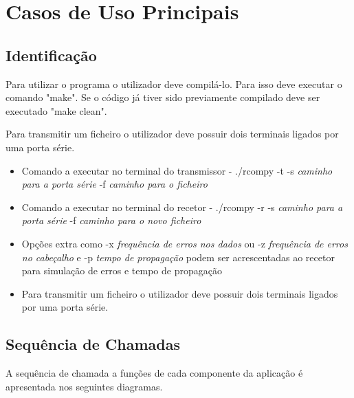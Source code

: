 \section{Casos de Uso Principais}

\subsection{Identificação}

Para utilizar o programa o utilizador deve compilá-lo. Para isso deve executar o comando "make". Se o código já tiver sido previamente compilado deve ser executado "make clean".

Para transmitir um ficheiro o utilizador deve possuir dois terminais ligados por uma porta série.
\begin{itemize}
    \item Comando a executar no terminal do transmissor - ./rcompy -t -s \textit{caminho para a porta série} -f \textit{caminho para o ficheiro}
    \item Comando a executar no terminal do recetor - ./rcompy -r -s \textit{caminho para a porta série} -f \textit{caminho para o novo ficheiro}
    \item Opções extra como -x \textit{frequência de erros nos dados} ou -z \textit{frequência de erros no cabeçalho} e -p \textit{tempo de propagação} podem ser acrescentadas ao recetor para simulação de erros e tempo de propagação
    \item Para transmitir um ficheiro o utilizador deve possuir dois terminais ligados por uma porta série. 
\end{itemize}



\subsection{Sequência de Chamadas}

A sequência de chamada a funções de cada componente da aplicação é apresentada nos seguintes diagramas.

